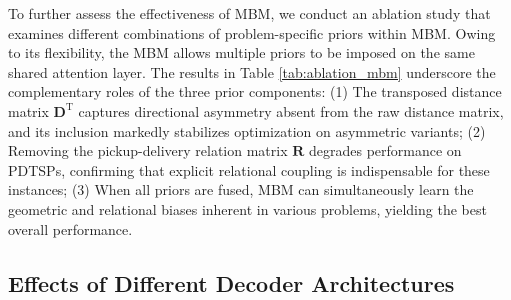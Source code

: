 \documentclass{article}
\theoremstyle{plain}
\theoremstyle{definition}
\theoremstyle{remark}
\begin{document}
To further assess the effectiveness of MBM, we conduct an ablation study that examines different combinations of problem-specific priors within MBM. Owing to its flexibility, the MBM allows multiple priors to be imposed on the same shared attention layer. The results in Table \ref{tab:ablation_mbm} underscore the complementary roles of the three prior components: (1) The transposed distance matrix $\bm{D^{\mathrm{T}}}$ captures directional asymmetry absent from the raw distance matrix, and its inclusion markedly stabilizes optimization on asymmetric variants; (2) Removing the pickup-delivery relation matrix $\bm{R}$ degrades performance on PDTSPs, confirming that explicit relational coupling is indispensable for these instances; (3) When all priors are fused, MBM can simultaneously learn the geometric and relational biases inherent in various problems, yielding the best overall performance.

\subsection{Effects of Different Decoder Architectures}
\label{append:ablation_decoder}
\end{document}
